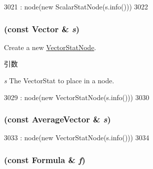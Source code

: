 \begin{DoxyCode}
3021         : node(new ScalarStatNode(s.info()))
3022     { }
\end{DoxyCode}
\hypertarget{classStats_1_1Temp_a816e31af4e3bc9574b48f56beb859ed3}{
\subsubsection[{Temp}]{ (const {\bf Vector} \& {\em s})}}
\label{classStats_1_1Temp_a816e31af4e3bc9574b48f56beb859ed3}
Create a new \hyperlink{classStats_1_1VectorStatNode}{VectorStatNode}. 
\begin{DoxyParams}{引数}
\item[{\em s}]The VectorStat to place in a node. \end{DoxyParams}



\begin{DoxyCode}
3029         : node(new VectorStatNode(s.info()))
3030     { }
\end{DoxyCode}
\hypertarget{classStats_1_1Temp_ab01c5c7ff86acd9ebfe39447408c9638}{
\subsubsection[{Temp}]{ (const {\bf AverageVector} \& {\em s})}}
\label{classStats_1_1Temp_ab01c5c7ff86acd9ebfe39447408c9638}



\begin{DoxyCode}
3033         : node(new VectorStatNode(s.info()))
3034     { }
\end{DoxyCode}
\hypertarget{classStats_1_1Temp_a5f7c3083eb56b783e498d2c75154d277}{
\subsubsection[{Temp}]{ (const {\bf Formula} \& {\em f})}}
\label{classStats_1_1Temp_a5f7c3083eb56b783e498d2c75154d277}



